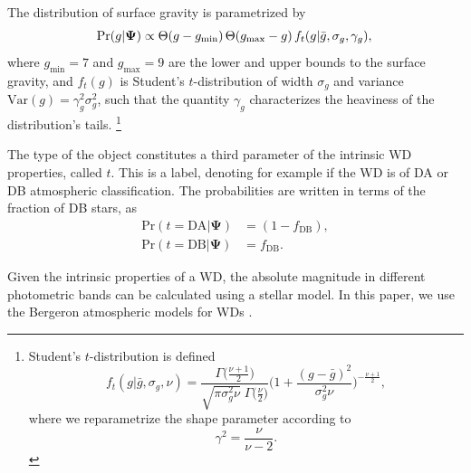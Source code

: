 \documentclass[fleqn,usenatbib]{mnras}
\newcommand{\popp}{\boldsymbol{\Psi}}
\newcommand{\logg}{g}
\newcommand{\pr}{\text{Pr}}
\begin{document}
The distribution of surface gravity is parametrized by
\begin{equation}\label{eq:T&g}
    \pr(\logg | \popp) \propto \Theta(\logg - \logg_\text{min}) \, \Theta(\logg_\text{max} - \logg) \, f_t(\logg|\bar{g},\sigma_g,\gamma_g),\\
\end{equation}
where $\logg_\text{min}=7$ and $\logg_\text{max}=9$ are the lower and upper bounds to the surface gravity, and $f_t(\logg)$ is Student's $t$-distribution of width $\sigma_g$ and variance $\text{Var}(g) = \gamma_g^2 \sigma_g^2$, such that the quantity $\gamma_g$ characterizes the heaviness of the distribution's tails.
\footnote{
Student's $t$-distribution is defined
\begin{equation}
	f_t(\logg|\bar{g},\sigma_g,\nu) =
	\frac{\Gamma\big( \frac{\nu+1}{2} \big)}{\sqrt{\pi\sigma_g^2\nu}\;\Gamma\big( \frac{\nu}{2} \big)}
	\Bigg( 1+\frac{(\logg-\bar{g})^2}{\sigma_g^2\nu} \Bigg)^{-\frac{\nu+1}{2}},
\end{equation}
where we reparametrize the shape parameter according to
\begin{equation}
	\gamma^2 = \frac{\nu}{\nu-2}.
\end{equation}
}

The type of the object constitutes a third parameter of the intrinsic WD properties, called $t$. This is a label, denoting for example if the WD is of DA or DB atmospheric classification. The probabilities are written in terms of the fraction of DB stars, as
\begin{equation}\label{eq:DADB}
\begin{split}
	\pr(t=\text{DA} | \popp) & = (1-f_\text{DB}),\\
    \pr(t=\text{DB} | \popp) & = f_\text{DB}.
\end{split}
\end{equation}

Given the intrinsic properties of a WD, the absolute magnitude in different photometric bands can be calculated using a stellar model. In this paper, we use the Bergeron atmospheric models for WDs \citep{Bergeron:1995we,Finley:1997zz,Bergeron:2000ce,2001PASP..113..409F}.
\end{document}
